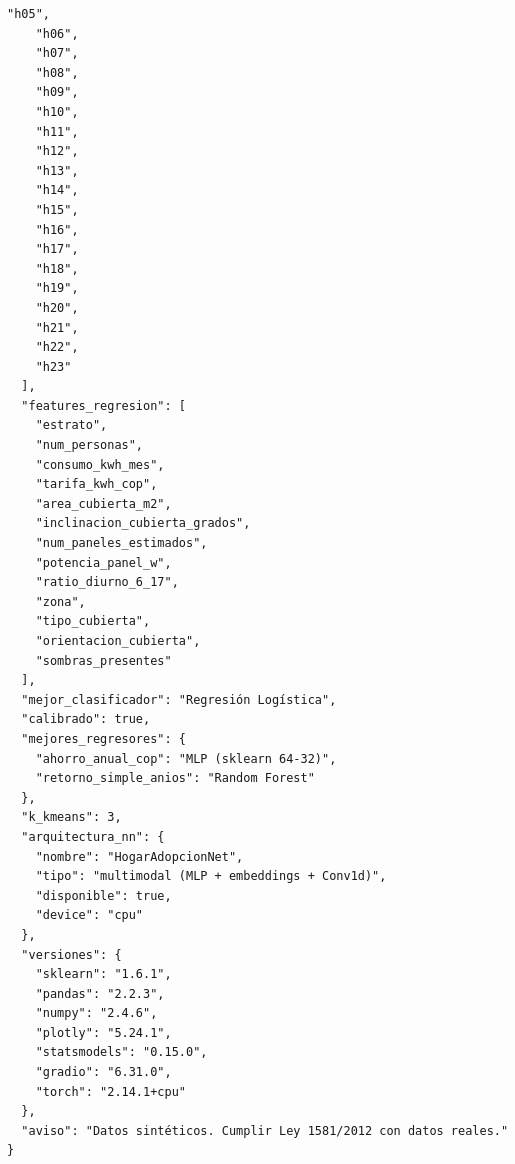 \begin{lstlisting}[caption={Metadatos completos del experimento},basicstyle=\tiny\ttfamily]
    "h05",
    "h06",
    "h07",
    "h08",
    "h09",
    "h10",
    "h11",
    "h12",
    "h13",
    "h14",
    "h15",
    "h16",
    "h17",
    "h18",
    "h19",
    "h20",
    "h21",
    "h22",
    "h23"
  ],
  "features_regresion": [
    "estrato",
    "num_personas",
    "consumo_kwh_mes",
    "tarifa_kwh_cop",
    "area_cubierta_m2",
    "inclinacion_cubierta_grados",
    "num_paneles_estimados",
    "potencia_panel_w",
    "ratio_diurno_6_17",
    "zona",
    "tipo_cubierta",
    "orientacion_cubierta",
    "sombras_presentes"
  ],
  "mejor_clasificador": "Regresión Logística",
  "calibrado": true,
  "mejores_regresores": {
    "ahorro_anual_cop": "MLP (sklearn 64-32)",
    "retorno_simple_anios": "Random Forest"
  },
  "k_kmeans": 3,
  "arquitectura_nn": {
    "nombre": "HogarAdopcionNet",
    "tipo": "multimodal (MLP + embeddings + Conv1d)",
    "disponible": true,
    "device": "cpu"
  },
  "versiones": {
    "sklearn": "1.6.1",
    "pandas": "2.2.3",
    "numpy": "2.4.6",
    "plotly": "5.24.1",
    "statsmodels": "0.15.0",
    "gradio": "6.31.0",
    "torch": "2.14.1+cpu"
  },
  "aviso": "Datos sintéticos. Cumplir Ley 1581/2012 con datos reales."
}
\end{lstlisting}
